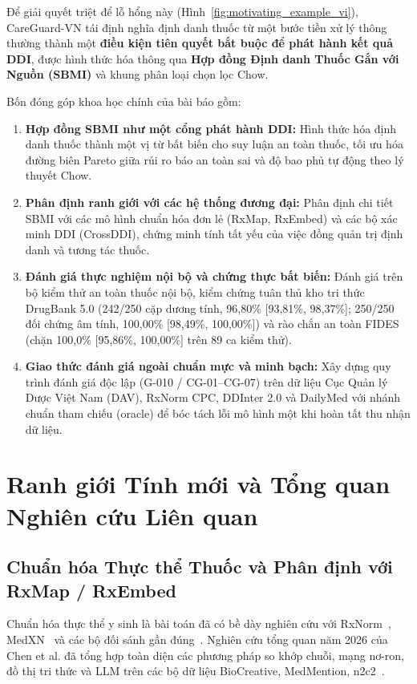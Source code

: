 \documentclass[11pt]{article}
\begin{document}
Để giải quyết triệt để lỗ hổng này (Hình~\ref{fig:motivating_example_vi}), CareGuard-VN tái định nghĩa định danh thuốc từ một bước tiền xử lý thông thường thành một \textbf{điều kiện tiên quyết bắt buộc để phát hành kết quả DDI}, được hình thức hóa thông qua \textbf{Hợp đồng Định danh Thuốc Gắn với Nguồn (SBMI)} và khung phân loại chọn lọc Chow.

Bốn đóng góp khoa học chính của bài báo gồm:
\begin{enumerate}
  \item \textbf{Hợp đồng SBMI như một cổng phát hành DDI:} Hình thức hóa định danh thuốc thành một vị từ bất biến cho suy luận an toàn thuốc, tối ưu hóa đường biên Pareto giữa rủi ro báo an toàn sai và độ bao phủ tự động theo lý thuyết Chow.
  \item \textbf{Phân định ranh giới với các hệ thống đương đại:} Phân định chi tiết SBMI với các mô hình chuẩn hóa đơn lẻ (RxMap, RxEmbed) và các bộ xác minh DDI (CrossDDI), chứng minh tính tất yếu của việc đồng quản trị định danh và tương tác thuốc.
  \item \textbf{Đánh giá thực nghiệm nội bộ và chứng thực bất biến:} Đánh giá trên bộ kiểm thử an toàn thuốc nội bộ, kiểm chứng tuân thủ kho tri thức DrugBank 5.0 (242/250 cặp dương tính, 96,80\% [93,81\%, 98,37\%]; 250/250 đối chứng âm tính, 100,00\% [98,49\%, 100,00\%]) và rào chắn an toàn FIDES (chặn 100,0\% [95,86\%, 100,00\%] trên 89 ca kiểm thử).
  \item \textbf{Giao thức đánh giá ngoài chuẩn mực và minh bạch:} Xây dựng quy trình đánh giá độc lập (G-010 / CG-01--CG-07) trên dữ liệu Cục Quản lý Dược Việt Nam (DAV), RxNorm CPC, DDInter 2.0 và DailyMed với nhánh chuẩn tham chiếu (oracle) để bóc tách lỗi mô hình một khi hoàn tất thu nhận dữ liệu.
\end{enumerate}

\section{Ranh giới Tính mới và Tổng quan Nghiên cứu Liên quan}

\subsection{Chuẩn hóa Thực thể Thuốc và Phân định với RxMap / RxEmbed}
Chuẩn hóa thực thể y sinh là bài toán đã có bề dày nghiên cứu với RxNorm~\cite{nelson2011rxnorm}, MedXN~\cite{sohn2014medxn} và các bộ đối sánh gần đúng~\cite{peters2011approx}. Nghiên cứu tổng quan năm 2026 của Chen et al. đã tổng hợp toàn diện các phương pháp so khớp chuỗi, mạng nơ-ron, đồ thị tri thức và LLM trên các bộ dữ liệu BioCreative, MedMention, n2c2~\cite{chen2026mcnsurvey,luo2020n2c2}.
\end{document}
